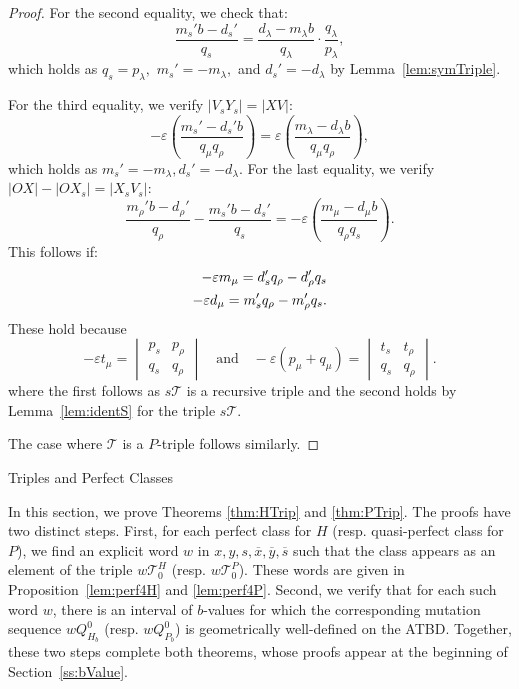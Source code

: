 \documentclass[11pt, reqno]{amsart}
\makeatletter
\def\section{\@startsection{section}{1}%
  \z@{.7\linespacing\@plus\linespacing}{.5\linespacing}%
  {\normalfont\Large\bfseries}}
\theoremstyle{remark}
\numberwithin{equation}{subsection}
\numberwithin{figure}{section}
\theoremstyle{customremark}
\newcommand{\Tt}{\mathcal{T}}
\newcommand{\ov}{\overline}
\newcommand{\la}{{\lambda}}
\newcommand{\eps}{\varepsilon}
\makeatother
\begin{document}
\begin{proof}
    For the second equality, we check that:
    \[ \frac{m_s'b-d_s'}{q_s}=\frac{d_\la-m_\la b}{q_\la}\cdot \frac{q_\la}{p_\la},\] which holds as $q_s=p_\la,$ $m_s'=-m_\la,$ and $d_s'=-d_\la$ by Lemma~\ref{lem:symTriple}.

    For the third equality, we verify $|V_sY_s|=|XV|$:
    \[-\eps \left(\frac{m_s'-d_s'b}{q_\mu q_\rho}\right)=\eps \left(\frac{m_\la-d_\la b}{q_\mu q_\rho}\right),\]
    which holds as $m_s'=-m_\la, d_s'=-d_\la$. 
    For the last equality, we verify $|OX|-|OX_s|=|X_sV_s|:$
    \[ \frac{m_\rho'b-d_\rho'}{q_\rho}-\frac{m_s'b-d_s'}{q_s}=-\eps\left(\frac{m_\mu-d_\mu b}{q_\rho q_s}\right).\] This follows if:
    \begin{align} \label{eq:sATF2}
        -\eps m_\mu=d_s' q_\rho-d_\rho' q_s\notag \\
        -\eps d_\mu=m_s' q_\rho-m_\rho 'q_s.
    \end{align}
   These hold because 
    \[-\eps t_\mu=\begin{vmatrix}p_s & p_\rho \\ q_s & q_\rho \end{vmatrix} \quad \text{and} \quad
    -\eps(p_\mu+q_\mu)=\begin{vmatrix}
             t_s &  t_\rho \\ q_s & q_\rho
        \end{vmatrix}.
    \]
    where the first follows as $s\Tt$ is a recursive triple and the second holds by Lemma~\ref{lem:identS} for the triple $s\Tt.$
   
    The case where $\Tt$ is a $P$-triple follows similarly. 
\end{proof}



\section{Triples and Perfect Classes}\label{ss:tripPerf}

In this section, we prove Theorems \ref{thm:HTrip} and \ref{thm:PTrip}. The proofs have two distinct steps. First, for each perfect class for $H$ (resp. quasi-perfect class for $P$), we find an explicit word $w$ in $x,y,s,\ov{x},\ov{y},\ov{s}$ such that the class appears as an element of the triple $w\Tt_0^H$ (resp. $w\Tt_0^P$). These words are given in Proposition~\ref{lem:perf4H} and \ref{lem:perf4P}. Second, we verify that for each such word $w$, there is an interval of $b$-values
for which the corresponding mutation sequence $wQ_{H_b}^0$ (resp. $wQ_{P_b}^0$)
is geometrically well-defined on the ATBD. Together, these two steps complete both theorems, whose proofs appear at the beginning of Section~\ref{ss:bValue}. 
\end{document}
